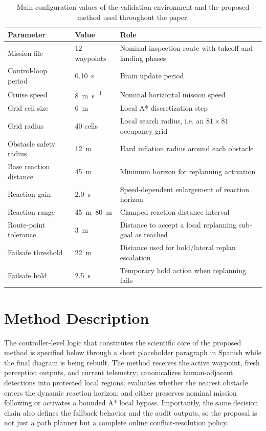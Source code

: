 \documentclass[a4paper,11pt]{article}
\begin{document}
\begin{table}[t]
    \centering
    \caption{Main configuration values of the validation environment and the proposed method used throughout the paper.}
    \label{tab:config}
    \small
    \begin{tabularx}{\linewidth}{@{}l l Y@{}}
        \toprule
        \textbf{Parameter} & \textbf{Value} & \textbf{Role} \\
        \midrule
        Mission file & 12 waypoints & Nominal inspection route with takeoff and landing phases \\
        Control-loop period & \SI{0.10}{\second} & Brain update period \\
        Cruise speed & \SI{8}{\meter\per\second} & Nominal horizontal mission speed \\
        Grid cell size & \SI{6}{\meter} & Local A* discretization step \\
        Grid radius & 40 cells & Local search radius, i.e. an \(81 \times 81\) occupancy grid \\
        Obstacle safety radius & \SI{12}{\meter} & Hard inflation radius around each obstacle \\
        Base reaction distance & \SI{45}{\meter} & Minimum horizon for replanning activation \\
        Reaction gain & \SI{2.0}{\second} & Speed-dependent enlargement of reaction horizon \\
        Reaction range & \SIrange{45}{80}{\meter} & Clamped reaction distance interval \\
        Route-point tolerance & \SI{3}{\meter} & Distance to accept a local replanning sub-goal as reached \\
        Failsafe threshold & \SI{22}{\meter} & Distance used for hold/lateral replan escalation \\
        Failsafe hold & \SI{2.5}{\second} & Temporary hold action when replanning fails \\
        \bottomrule
    \end{tabularx}
\end{table}

\section{Method Description}

The controller-level logic that constitutes the scientific core of the proposed method is specified below through a short placeholder paragraph in Spanish while the final diagram is being rebuilt. The method receives the active waypoint, fresh perception outputs, and current telemetry; canonicalizes human-adjacent detections into protected local regions; evaluates whether the nearest obstacle enters the dynamic reaction horizon; and either preserves nominal mission following or activates a bounded A* local bypass. Importantly, the same decision chain also defines the fallback behavior and the audit outputs, so the proposal is not just a path planner but a complete online conflict-resolution policy.
\end{document}
